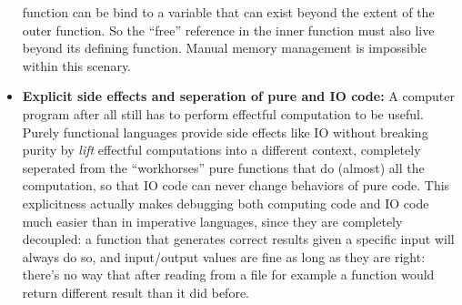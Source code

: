 \documentclass[../gr-final.tex]{subfiles}
\begin{document}
\begin{itemize}
               function can be bind to a variable that can exist
               beyond the extent of the outer function. So the
               ``free'' reference in the inner function must also live
               beyond its defining function. Manual memory
               management is impossible within this scenary.
       \item {\bfseries Explicit side effects and seperation of
               pure and IO code: } A computer program after all
               still has to perform effectful computation to be
               useful. Purely functional languages provide side
               effects like IO without breaking purity by {\it
               lift} effectful computations into a different
               context, completely seperated from the
               ``workhorses'' pure functions that do (almost) all
               the computation, so that IO code can never change
               behaviors of pure code. This explicitness actually
               makes debugging both computing code and IO code much 
               easier than in imperative languages, since they
               are completely decoupled: a function that
               generates correct results given a specific input
               will always do so, and input/output values are fine as
               long as they are right: there's no way that after reading
               from a file for example a function would return different 
               result than it did before.
\end{itemize}                
\end{document}
